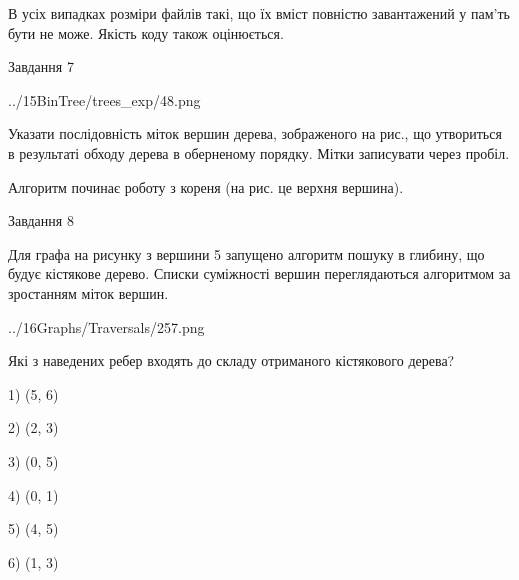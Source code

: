 \documentclass[12pt, ukrainian]{article}
\begin{document}
{В усіх випадках розміри файлів такі, що їх вміст повністю завантажений у пам'ть бути не може. Якість коду також оцінюється.



\vspace{10mm}\par

\newpage
\begin{minipage}[t]{9.7cm}
               
{\begin{center}Завдання {7}\end{center}}
\vspace{-4mm}

\begin{center}
	{../15BinTree/trees_exp/48.png}
\end{center}
Указати послідовність міток вершин дерева, зображеного на рис., що утвориться в результаті обходу дерева в оберненому порядку. Мітки записувати через пробіл.\par Алгоритм починає роботу з кореня (на рис. це верхня вершина).\par

\end{minipage}
\vline \hspace{8mm}
\begin{minipage}[t]{8.0cm}
               
{\begin{center}Завдання {8}\end{center}}
\vspace{-4mm}
Для графа на рисунку з вершини 5 запущено алгоритм пошуку в глибину, що будує кістякове дерево. Списки суміжності вершин переглядаються алгоритмом за зростанням міток вершин.\par
\begin{center}
	{../16Graphs/Traversals/257.png}
\end{center}
\par Які з наведених ребер входять до складу отриманого кістякового дерева?\par
1) (5, 6)\par
2) (2, 3)\par
3) (0, 5)\par
4) (0, 1)\par
5) (4, 5)\par
6) (1, 3)\par
{\vskip 15pt} \par


\end{minipage}}
\end{document}
